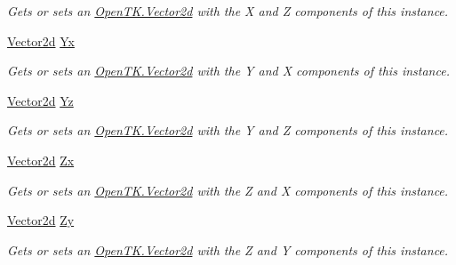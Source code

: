 \begin{DoxyCompactItemize}
\begin{DoxyCompactList}\small\item\em Gets or sets an \hyperlink{struct_open_t_k_1_1_vector2d}{Open\-T\-K.\-Vector2d} with the X and Z components of this instance. \end{DoxyCompactList}\item 
\hyperlink{struct_open_t_k_1_1_vector2d}{Vector2d} \hyperlink{struct_open_t_k_1_1_vector3d_a2085dfeb2b1f46e06bbf5429369cf473}{Yx}
\begin{DoxyCompactList}\small\item\em Gets or sets an \hyperlink{struct_open_t_k_1_1_vector2d}{Open\-T\-K.\-Vector2d} with the Y and X components of this instance. \end{DoxyCompactList}\item 
\hyperlink{struct_open_t_k_1_1_vector2d}{Vector2d} \hyperlink{struct_open_t_k_1_1_vector3d_aa4e666b501c263a4dbc03f2aadee8c18}{Yz}
\begin{DoxyCompactList}\small\item\em Gets or sets an \hyperlink{struct_open_t_k_1_1_vector2d}{Open\-T\-K.\-Vector2d} with the Y and Z components of this instance. \end{DoxyCompactList}\item 
\hyperlink{struct_open_t_k_1_1_vector2d}{Vector2d} \hyperlink{struct_open_t_k_1_1_vector3d_a80d1ecc7d4722af5295bbacec4d4f47f}{Zx}
\begin{DoxyCompactList}\small\item\em Gets or sets an \hyperlink{struct_open_t_k_1_1_vector2d}{Open\-T\-K.\-Vector2d} with the Z and X components of this instance. \end{DoxyCompactList}\item 
\hyperlink{struct_open_t_k_1_1_vector2d}{Vector2d} \hyperlink{struct_open_t_k_1_1_vector3d_ad49db3a01526f1557d1b8144d560ccaf}{Zy}
\begin{DoxyCompactList}\small\item\em Gets or sets an \hyperlink{struct_open_t_k_1_1_vector2d}{Open\-T\-K.\-Vector2d} with the Z and Y components of this instance. \end{DoxyCompactList}\item 

\end{DoxyCompactItemize}
